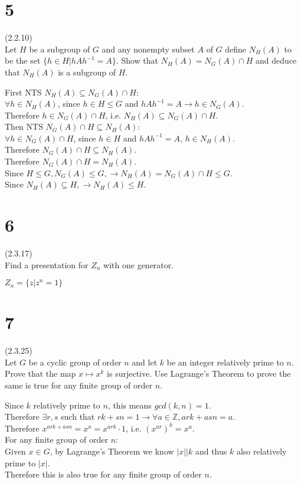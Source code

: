 \documentclass{article}
\begin{document}
\section*{5}
(2.2.10)\\
Let $H$ be a subgroup of $G$ and any nonempty subset $A$ of $G$ define $N_H(A)$ to be the set $\{h \in H | hAh^{-1} = A\}$. Show that $N_H(A) = N_G(A) \cap H$ and deduce that $N_H(A)$ is a subgroup of $H$.
\begin{addmargin}[1em]{0em}
    First NTS $N_H(A) \subseteq N_G(A) \cap H$:\\
    $\forall h \in N_H(A)$, since $h \in H \leq G$ and $hAh^{-1} = A \rightarrow h \in N_G(A)$.\\
    Therefore $h \in N_G(A) \cap H$, i.e. $N_H(A) \subseteq N_G(A) \cap H$.\\
    Then NTS $N_G(A) \cap H \subseteq N_H(A)$:\\
    $\forall h \in N_G(A) \cap H$, since $h \in H$ and $hAh^{-1} = A$, $h \in N_H(A)$.\\
    Therefore $N_G(A) \cap H \subseteq N_H(A)$.\\
    Therefore $N_G(A) \cap H = N_H(A)$.\\
    Since $H \leq G, N_G(A) \leq G, \rightarrow N_H(A)=N_G(A) \cap H \leq G$.\\
    Since $N_H(A) \subseteq H, \rightarrow N_H(A) \leq H$.
\end{addmargin}
\section*{6}
(2.3.17)\\
Find a presentation for $Z_n$ with one generator.
\begin{addmargin}[1em]{0em}
    $Z_n = \{z|z^n=1\}$
\end{addmargin}
\section*{7}
(2.3.25)\\
Let $G$ be a cyclic group of order $n$ and let $k$ be an integer relatively prime to $n$. Prove that the map $x \mapsto x^k$ is surjective. Use Lagrange's Theorem to prove the same is true for any finite group of order $n$.
\begin{addmargin}[1em]{0em}
    Since $k$ relatively prime to $n$, this means $gcd(k, n) = 1$.\\
    Therefore $\exists r, s$ such that $rk+sn = 1 \rightarrow \forall a \in \mathbb{Z}, ark+asn = a$.\\
    Therefore $x^{ark+asn} = x^a = x^{ark} \cdot 1$, i.e. $(x^{ar})^k = x^a$.\\
    For any finite group of order $n$:\\
    Given $x \in G$, by Lagrange's Theorem we know $|x||k$ and thus $k$ also relatively prime to $|x|$.\\
    Therefore this is also true for any finite group of order $n$.
\end{addmargin}
\end{document}
